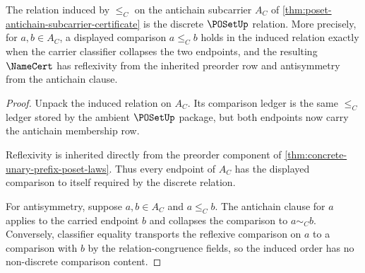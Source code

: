 \begin{theorem}
\label{thm:poset-antichain-discrete-namecert}
The relation induced by $\le_C$ on the antichain subcarrier
$A_C$ of \autoref{thm:poset-antichain-subcarrier-certificate} is the discrete
$\POSetUp$ relation. More precisely, for $a,b\in A_C$, a displayed comparison
$a\le_C b$ holds in the induced relation exactly when the carrier classifier
collapses the two endpoints, and the resulting $\NameCert$ has reflexivity
from the inherited preorder row and antisymmetry from the antichain clause.
\end{theorem}
\begin{proof}
Unpack the induced relation on $A_C$. Its comparison ledger is the same
$\le_C$ ledger stored by the ambient $\POSetUp$ package, but both endpoints now
carry the antichain membership row.

Reflexivity is inherited directly from the preorder component of
\autoref{thm:concrete-unary-prefix-poset-laws}. Thus every endpoint of $A_C$
has the displayed comparison to itself required by the discrete relation.

For antisymmetry, suppose $a,b\in A_C$ and $a\le_C b$. The antichain clause for
$a$ applies to the carried endpoint $b$ and collapses the comparison to
$a\sim_C b$. Conversely, classifier equality transports the reflexive
comparison on $a$ to a comparison with $b$ by the relation-congruence fields,
so the induced order has no non-discrete comparison content.
\end{proof}

